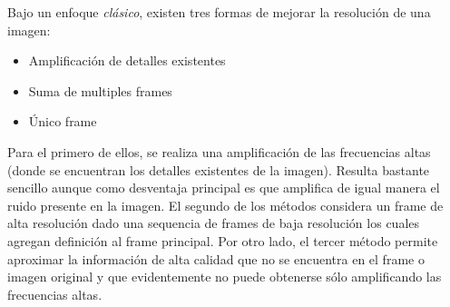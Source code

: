 \noindent
Bajo un enfoque \emph{clásico}, existen tres formas de mejorar la resolución 
de una imagen:

\begin{itemize}
    \item Amplificación de detalles existentes
    \item Suma de multiples frames
    \item Único frame
\end{itemize}

Para el primero de ellos, se realiza una amplificación de las frecuencias altas
(donde se encuentran los detalles existentes de la imagen). Resulta bastante 
sencillo aunque como desventaja principal es que amplifica de igual manera el ruido
presente en la imagen. 
El segundo de los métodos considera un frame de alta resolución dado una sequencia
de frames de baja resolución los cuales agregan definición al frame principal. Por
otro lado, el tercer método permite aproximar la información de alta calidad que 
no se encuentra en el frame o imagen original y que evidentemente no puede obtenerse
sólo amplificando las frecuencias altas. 